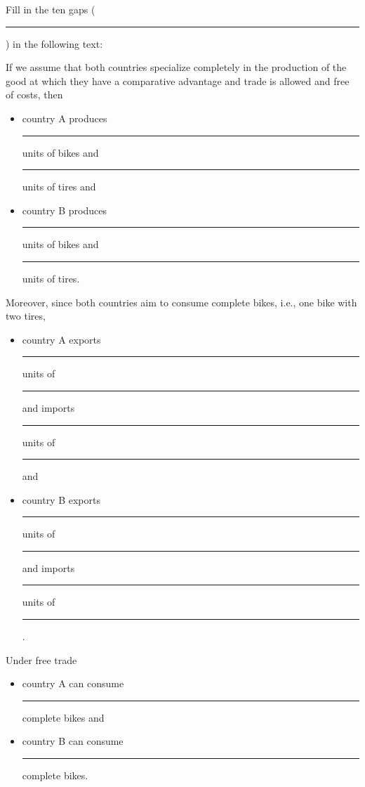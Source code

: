 {{			\item Fill in the ten gaps (\rule{5em}{.4mm}) in the following text:
			
			If we assume that both countries specialize completely in the production of the good at which they have a comparative advantage and trade is allowed and free of costs, then 
			\begin{itemize}
				\item
				country A produces \rule{5em}{.4mm} units of bikes and \rule{5em}{.4mm} units of tires and
				\item 
				country B produces \rule{5em}{.4mm} units of bikes and \rule{5em}{.4mm} units of tires.
			\end{itemize}
			Moreover, since both countries aim to consume complete bikes, i.e., one bike with two tires,
			\begin{itemize}
				\item
				country A exports \rule{4em}{.4mm} units of \rule{4em}{.4mm} and imports \rule{4em}{.4mm} units of \rule{4em}{.4mm} and 
				\item 
				country B exports \rule{4em}{.4mm} units of \rule{4em}{.4mm} and imports \rule{4em}{.4mm} units of \rule{4em}{.4mm}.
			\end{itemize}
			Under free trade 
			\begin{itemize}
				\item country A can consume \rule{5em}{.4mm} complete bikes and 
				\item country B can consume \rule{5em}{.4mm} complete bikes.
			\end{itemize}
			
	}}
	

